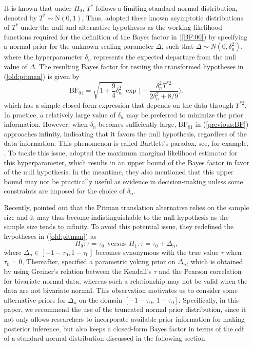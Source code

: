\documentclass[11pt]{article}
\begin{document}
It is known that under $H_0$, $T^\ast$ follows a limiting standard normal distribution, denoted by $T^\ast \sim \text{N}(0, 1)$, Thus, \cite{Yuan:John:2008} adopted these known asymptotic distributions of $T^\ast$ under the null and alternative hypotheses as the working likelihood functions required for the definition of the Bayes factor in (\ref{BF:00}) by specifying a normal prior for the unknown scaling parameter $\Delta$, such that $\Delta \sim N(0, \delta_n^2)$, where the hyperparameter $\delta_n$ represents the expected departure from the null value of $\Delta$. The resulting Bayes factor for testing the transformed hypotheses in (\ref{old:pitman}) is given by
\begin{equation} \label{previous:BF}
\mathrm{BF}_{01} = \sqrt{1+\frac{9}{4}\delta_n^2} ~\exp \biggl(-\frac{\delta_n^2 T^{*2}}{2\delta_n^2+8/9}\biggr),
\end{equation}
which has a simple closed-form expression that depends on the data through $T^{*2}$. In practice, a relatively large value of $\delta_n$ may be preferred to minimize the prior information. However, when $\delta_n$ becomes sufficiently large, $\mathrm{BF}_{01}$ in (\ref{previous:BF}) approaches infinity, indicating that it favors the null hypothesis, regardless of the data information. This phenomenon is called Bartlett’s paradox, see, for example, \cite{Bart:1957, Jeff:1961}. To tackle this issue, \cite{Yuan:John:2008} adopted the maximum marginal likelihood estimator for this hyperparameter, which results in an upper bound of the Bayes factor in favor of the null hypothesis. In the meantime, they also mentioned that this upper bound may not be practically useful as evidence in decision-making unless some constraints are imposed for the choice of $\delta_n$.

Recently, \cite{Doorn:Ly:Wage:2018} pointed out that the Pitman translation alternative relies on the sample size and it may thus become indistinguishable to the null hypothesis as the sample size tends to infinity. To avoid this potential issue, they redefined the hypotheses in (\ref{old:pitman}) as
\begin{equation} \label{test:hyp}
H_0: \tau = \tau_0 \ \ \mathrm{versus} \ \ H_1: \tau = \tau_0 +  \Delta_n,
\end{equation}
where $\Delta_n \in [-1 - \tau_0, 1 - \tau_0]$ becomes synonymous with the true value $\tau$ when $\tau_0 = 0$, Thereafter, \cite{Doorn:Ly:Wage:2018} specified a parametric yoking prior on $\Delta_n$, which is obtained by using Greiner’s relation between the Kendall's $\tau$ and the Pearson correlation for bivariate normal data, whereas such a relationship may not be valid when the data are not bivariate normal. This observation motivates us to consider some alternative priors for $\Delta_n$ on the domain $[ -1-\tau_0, ~1-\tau_0]$. Specifically, in this paper, we recommend the use of  the truncated normal prior distribution, since it not only allows researchers to incorporate available prior information for making posterior inference, but also keeps a closed-form Bayes factor in terms of the cdf of a standard normal distribution discussed in the following section.
\end{document}
